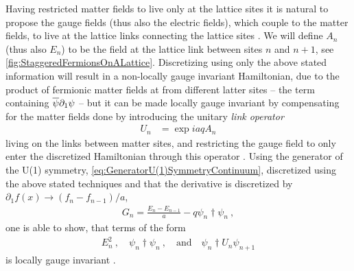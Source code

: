 \documentclass[../main.tex]{subfiles} %
\begin{document}
Having restricted matter fields to live only at the lattice sites it is natural to propose the gauge fields (thus also the electric fields), which couple to the matter fields, to live at the lattice links connecting the lattice sites \cite{melnikov_latticeSchwingerModel_2000}. We will define $A_n$ (thus also $E_n$) to be the field at the lattice link between sites $n$ and $n + 1$, see \cref{fig:StaggeredFermionsOnALattice}. Discretizing using only the above stated information will result in a non-locally gauge invariant Hamiltonian, due to the product of fermionic matter fields at from different latter sites -- the term containing $\overline{\psi}\partial_1\psi$ -- but it can be made locally gauge invariant by compensating for the matter fields done by introducing the unitary \emph{link operator}
\begin{align}
    U_n &= \exp{iaqA_n}
\end{align}
living on the links between matter sites, and restricting the gauge field to only enter the discretized Hamiltonian through this operator \cite{banksSusskindKogut_StrongCoupling_1976}. Using the generator of the U(1) symmetry, \cref{eq:GeneratorU(1)SymmetryContinuum}, discretized using the above stated techniques and that the derivative is discretized by $\partial_1 f(x) \rightarrow (f_n - f_{n - 1}) / a$,
\begin{align} \label{eq:GeneratorU(1)SymmetryDiscretized}
    G_n = \frac{E_n - E_{n-1}}{a} - q \psi_n\dagger \psi_n \: ,
\end{align}
one is able to show, that terms of the form
\begin{align} \label{eq:LatticeGaugeTheory_LocallyGaugeInvariantTerms}
    E_n^2 \: , \quad \psi_n\dagger \psi_n \: , \quad \text{and} \quad \psi_n\dagger U_n \psi_{n+1}
\end{align}
is locally gauge invariant \cite{banksSusskindKogut_StrongCoupling_1976, panyella_masterThesis_2019}.
\end{document}
